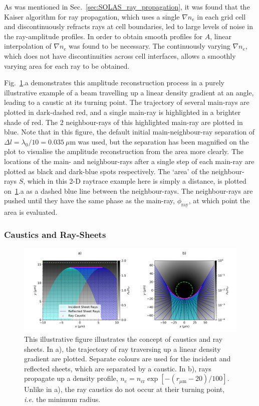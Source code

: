 As was mentioned in Sec.~\ref{sec:SOLAS_ray_propagation}, it was found that the Kaiser algorithm for ray propagation, which uses a single $\nabla n_e$ in each grid cell and discontinuously refracts rays at cell boundaries, led to large levels of noise in the ray-amplitude profiles.
In order to obtain smooth profiles for $A$, linear interpolation of $\nabla n_e$ was found to be necessary.
The continuously varying $\nabla n_e$, which does not have discontinuities across cell interfaces, allows a smoothly varying area for each ray to be obtained.

Fig.~\ref{fig:SOLAS_fieldcap_diagram}.a demonstrates this amplitude reconstruction process in a purely illustrative example of a beam travelling up a linear density gradient at an angle, leading to a caustic at its turning point.
The trajectory of several main-rays are plotted in dark-dashed red, and a single main-ray is highlighted in a brighter shade of red.
The 2 neighbour-rays of this highlighted main-ray are plotted in blue.
Note that in this figure, the default initial main-neighbour-ray separation of $\Delta l=\lambda_0/10=0.035\ \mu\text{m}$ was used, but the separation has been magnified on the plot to visualise the amplitude reconstruction from the area more clearly.
The locations of the main- and neighbour-rays after a single step of each main-ray are plotted as black and dark-blue spots respectively.
The `area' of the neighbour-rays $S$, which in this 2-D raytrace example here is simply a distance, is plotted on~\ref{fig:SOLAS_fieldcap_diagram}.a as a dashed blue line between the neighbour-rays.
The neighbour-rays are pushed until they have the same phase as the main-ray, $\phi_{\text{ray}}$, at which point the area is evaluated.

\subsubsection{Caustics and Ray-Sheets}

\begin{figure}[t!]
    \includegraphics[width=\linewidth]{Numerics/Images/Raysheets_withcyl.png}
    \centering
    \caption{This illustrative figure illustrates the concept of caustics and ray sheets.
    In a), the trajectory of ray traversing up a linear density gradient are plotted.
    Separate colours are used for the incident and reflected sheets, which are separated by a caustic.
    In b), rays propagate up a density profile, $n_e=n_{\text{cr}}\exp{[ -(r_{\mu\text{m}}-20)/100 ]}$.
    Unlike in a), the ray caustics do not occur at their turning point, \textit{i.e.} the minimum radius.}%
    \label{fig:SOLAS_fieldcap_diagram}
\end{figure}

